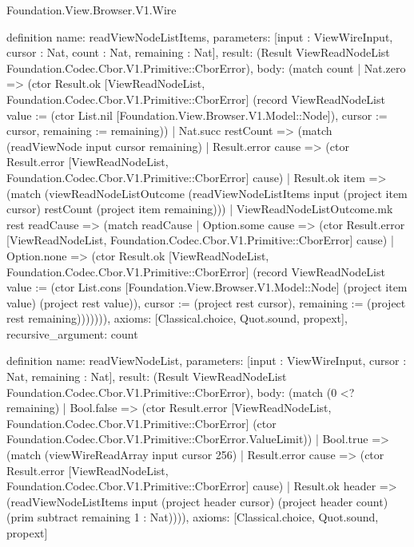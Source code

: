 \begin{lexlean}{Foundation.View.Browser.V1.Wire}
\begin{semanticmodule}
definition{
  name: readViewNodeListItems,
  parameters: [input : ViewWireInput, cursor : Nat, count : Nat, remaining : Nat],
  result: (Result ViewReadNodeList Foundation.Codec.Cbor.V1.Primitive::CborError),
  body: (match count
    | Nat.zero => (ctor Result.ok [ViewReadNodeList, Foundation.Codec.Cbor.V1.Primitive::CborError] (record ViewReadNodeList {value := (ctor List.nil [Foundation.View.Browser.V1.Model::Node]), cursor := cursor, remaining := remaining}))
    | Nat.succ restCount => (match (readViewNode input cursor remaining)
      | Result.error cause => (ctor Result.error [ViewReadNodeList, Foundation.Codec.Cbor.V1.Primitive::CborError] cause)
      | Result.ok item => (match (viewReadNodeListOutcome (readViewNodeListItems input (project item cursor) restCount (project item remaining)))
        | ViewReadNodeListOutcome.mk rest readCause => (match readCause
          | Option.some cause => (ctor Result.error [ViewReadNodeList, Foundation.Codec.Cbor.V1.Primitive::CborError] cause)
          | Option.none => (ctor Result.ok [ViewReadNodeList, Foundation.Codec.Cbor.V1.Primitive::CborError] (record ViewReadNodeList {value := (ctor List.cons [Foundation.View.Browser.V1.Model::Node] (project item value) (project rest value)), cursor := (project rest cursor), remaining := (project rest remaining)})))))),
  axioms: [Classical.choice, Quot.sound, propext],
  recursive_argument: count
}

definition{
  name: readViewNodeList,
  parameters: [input : ViewWireInput, cursor : Nat, remaining : Nat],
  result: (Result ViewReadNodeList Foundation.Codec.Cbor.V1.Primitive::CborError),
  body: (match (0 <? remaining)
    | Bool.false => (ctor Result.error [ViewReadNodeList, Foundation.Codec.Cbor.V1.Primitive::CborError] (ctor Foundation.Codec.Cbor.V1.Primitive::CborError.ValueLimit))
    | Bool.true => (match (viewWireReadArray input cursor 256)
      | Result.error cause => (ctor Result.error [ViewReadNodeList, Foundation.Codec.Cbor.V1.Primitive::CborError] cause)
      | Result.ok header => (readViewNodeListItems input (project header cursor) (project header count) (prim subtract remaining 1 : Nat)))),
  axioms: [Classical.choice, Quot.sound, propext]
}


\end{semanticmodule}
\end{lexlean}
